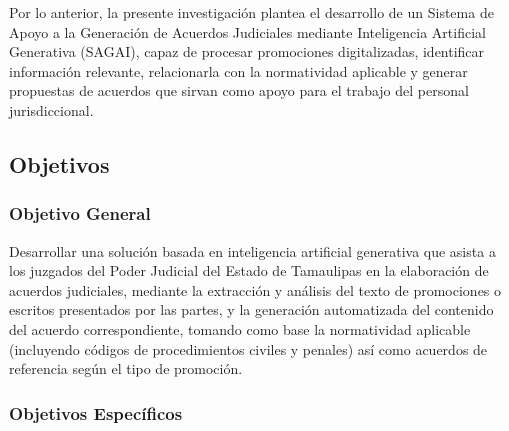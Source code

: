 Por lo anterior, la presente investigación plantea el desarrollo de un Sistema de Apoyo a la Generación de Acuerdos Judiciales mediante Inteligencia Artificial Generativa (SAGAI), capaz de procesar promociones digitalizadas, identificar información relevante, relacionarla con la normatividad aplicable y generar propuestas de acuerdos que sirvan como apoyo para el trabajo del personal jurisdiccional.

\subsection{Objetivos}
\label{sec:objetivos}

\subsubsection{Objetivo General}
\label{subsec:objetivo_general}

Desarrollar una solución basada en inteligencia artificial generativa que asista a los juzgados del Poder Judicial del Estado de Tamaulipas en la elaboración de acuerdos judiciales, mediante la extracción y análisis del texto de promociones o escritos presentados por las partes, y la generación automatizada del contenido del acuerdo correspondiente, tomando como base la normatividad aplicable (incluyendo códigos de procedimientos civiles y penales) así como acuerdos de referencia según el tipo de promoción.

\subsubsection{Objetivos Específicos}
\label{subsec:objetivos_especificos}

